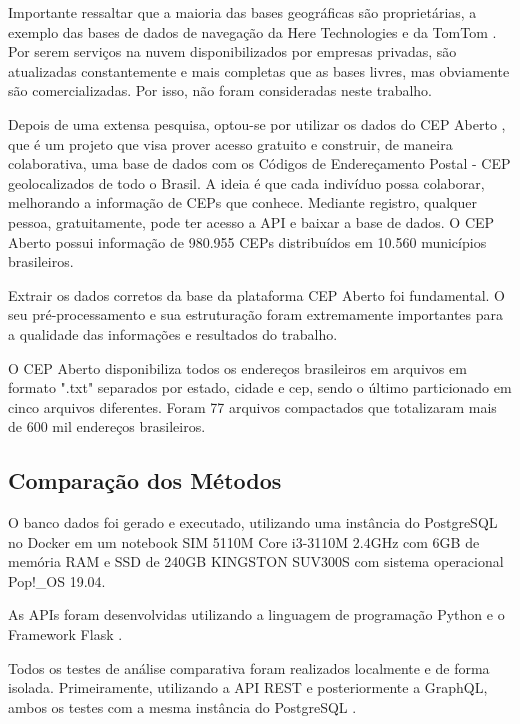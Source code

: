\documentclass[conference]{IEEEtran}
\begin{document}
Importante ressaltar que a maioria das bases geográficas são proprietárias, a exemplo das bases de dados de navegação da Here Technologies \cite{HereTech:2019} e da TomTom \cite{TomTom:2019}. Por serem serviços na nuvem disponibilizados por empresas privadas, são atualizadas constantemente e mais completas que as bases livres, mas obviamente são comercializadas. Por isso, não foram consideradas neste trabalho.

Depois de uma extensa pesquisa, optou-se por utilizar os dados do CEP Aberto \cite{CEPAberto:2019}, que é um projeto que visa prover acesso gratuito e construir, de maneira colaborativa, uma base de dados com os Códigos de Endereçamento Postal - CEP geolocalizados de todo o Brasil. A ideia é que cada indivíduo possa colaborar, melhorando a informação de CEPs que conhece. Mediante registro, qualquer pessoa, gratuitamente, pode ter acesso a API e baixar a base de dados. O CEP Aberto \cite{CEPAberto:2019} possui informação de 980.955 CEPs distribuídos em 10.560 municípios brasileiros.

Extrair os dados corretos da base da plataforma CEP Aberto \cite{CEPAberto:2019} foi fundamental. O seu pré-processamento e sua estruturação foram extremamente importantes para a qualidade das informações e resultados do trabalho.

O CEP Aberto \cite{CEPAberto:2019} disponibiliza todos os endereços brasileiros em arquivos em formato ".txt" separados por estado, cidade e cep, sendo o último particionado em cinco arquivos diferentes. Foram 77 arquivos compactados que totalizaram mais de 600 mil endereços brasileiros.

\subsection{Comparação dos Métodos}

O banco dados foi gerado e executado, utilizando uma instância do PostgreSQL \cite{PostgreSQL:2019} no Docker \cite{docker:2019} em um notebook SIM 5110M Core i3-3110M 2.4GHz com 6GB de memória RAM e SSD de 240GB KINGSTON SUV300S com sistema operacional Pop!\_OS 19.04.

As APIs foram desenvolvidas utilizando a linguagem de programação Python \cite{Python:2019} e o Framework Flask \cite{Flask:2019}. 

Todos os testes de análise comparativa foram realizados localmente e de forma isolada. Primeiramente, utilizando a API REST e posteriormente a GraphQL, ambos os testes com a mesma instância do PostgreSQL \cite{PostgreSQL:2019}.
\end{document}
